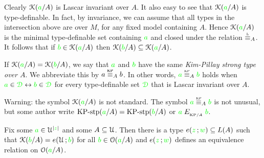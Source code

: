 \documentclass[creche.tex]{subfiles}
\begin{document}
Clearly $\EuScript K({\color{green} a}/A)$ is Lascar invariant over $A$.  It also easy to see that $\EuScript K({\color{green} a}/A)$ is type-definable. In fact, by invariance, we can assume that all types in the intersection above are over $M$, for any fixed model containing $A$. Hence $\EuScript K({\color{green} a}/A)$ is the minimal type-definable set containing ${\color{green} a}$ and closed under the relation $\equivL_A$. It follows that if ${\color{green} b}\in\EuScript K({\color{green} a}/A)$ then $\EuScript K({\color{green} b}/A)\subseteq\EuScript K({\color{green} a}/A)$. 

If $\EuScript K({\color{green} a}/A)=\EuScript K({\color{green} b}/A)$, we say that ${\color{green} a}$ and ${\color{green} b}$ have the same  \emph{Kim-Pillay strong type over $A$}. We abbreviate this by \emph{$a\stackrel{\smash{\scalebox{.5}{\rm\bf KP}}}{\equiv}_Ab$}. In other words, ${\gr a}\equivKP_A{\gr b}$ holds when ${\color{green} a}\in{\color{green}\EuScript D}\leftrightarrow{\color{green}b}\in{\color{green}\EuScript D}$ for every type-definable set ${\color{green}\EuScript D}$ that is Lascar invariant over $A$.


\noindent\llap{\textcolor{red}{\Large\danger}\kern1.5ex}Warning: the symbol $\EuScript K({\color{green} a}/A)$ is not standard. The symbol ${\gr a}\equivKP_A{\gr b}$ is not unusual, but some author write ${\rm KP{\mbox{-}}stp}({\color{green} a}/A)={\rm KP{\mbox{-}}stp}({\color{green} b}/A)$ or ${\color{green} a}\mathrel{E_{_{{\rm KP}/A}}}{\color{green} b}$.

\begin{proposition}\label{prop_bardotto}
  Fix some ${\color{green} a}\in\EuScript U^{|{\color{green} z}|}$ and some $A\subseteq\EuScript U$. Then there is a type $e({\color{green} z}\,;{\color{green} w})\subseteq L(A)$ such that $\EuScript K({\color{green} b}/A)=e(\EuScript U\,;{\color{green} b})$ for all ${\color{green} b}\in\EuScript O({\color{green} a}/A)$ and $e({\color{green} z}\,;{\color{green} w})$ defines an equivalence relation on $\EuScript O({\color{green} a}/A)$.
\end{proposition}
\end{document}
